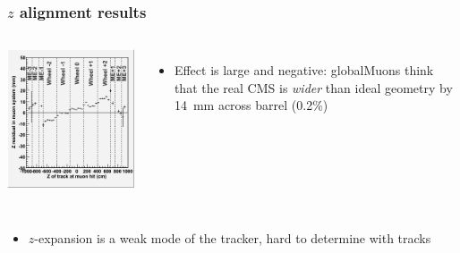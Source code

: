 \documentclass[compress]{beamer}
\begin{document}
\begin{frame}
\frametitle{$z$ alignment results}

\begin{columns}
\includegraphics[width=\linewidth]{zresid_from_muon.png}

\begin{itemize}
\item Effect is large and negative: globalMuons think that the real
  CMS is {\it wider} than ideal geometry by 14~mm across barrel (0.2\%)
\end{itemize}

\vspace{0.5 cm}

\end{columns}

\vspace{-1 cm}
\begin{columns}

\vspace{1 cm}
\begin{itemize}
\item $z$-expansion is a weak mode of the tracker, hard to determine with tracks


\end{itemize}
\end{columns}
\end{frame}
\end{document}
